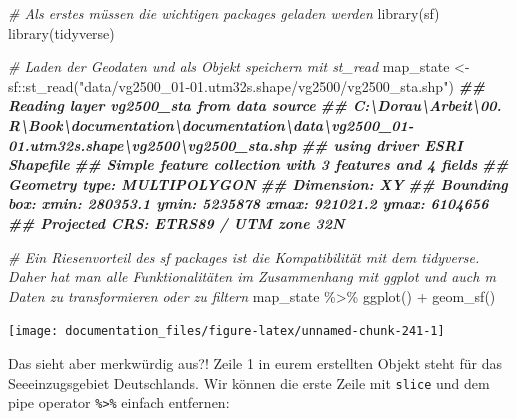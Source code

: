 \documentclass[
]{article}
\newenvironment{Shaded}{\begin{snugshade}}{\end{snugshade}}
\newcommand{\CommentTok}[1]{\textcolor[rgb]{0.56,0.35,0.01}{\textit{#1}}}
\newcommand{\DocumentationTok}[1]{\textcolor[rgb]{0.56,0.35,0.01}{\textbf{\textit{#1}}}}
\newcommand{\FunctionTok}[1]{\textcolor[rgb]{0.00,0.00,0.00}{#1}}
\newcommand{\NormalTok}[1]{#1}
\newcommand{\OtherTok}[1]{\textcolor[rgb]{0.56,0.35,0.01}{#1}}
\newcommand{\SpecialCharTok}[1]{\textcolor[rgb]{0.00,0.00,0.00}{#1}}
\newcommand{\StringTok}[1]{\textcolor[rgb]{0.31,0.60,0.02}{#1}}
\begin{document}
\begin{Shaded}
\begin{Highlighting}[]

\CommentTok{\# Als erstes müssen die wichtigen packages geladen werden}
\FunctionTok{library}\NormalTok{(sf)}
\FunctionTok{library}\NormalTok{(tidyverse)}

\CommentTok{\# Laden der Geodaten und als Objekt speichern mit \textasciigrave{}st\_read\textasciigrave{}}
\NormalTok{map\_state }\OtherTok{\textless{}{-}}\NormalTok{ sf}\SpecialCharTok{::}\FunctionTok{st\_read}\NormalTok{(}\StringTok{"data/vg2500\_01{-}01.utm32s.shape/vg2500/vg2500\_sta.shp"}\NormalTok{)}
\DocumentationTok{\#\# Reading layer \textasciigrave{}vg2500\_sta\textquotesingle{} from data source }
\DocumentationTok{\#\#   \textasciigrave{}C:\textbackslash{}Dorau\textbackslash{}Arbeit\textbackslash{}00. R\textbackslash{}Book\textbackslash{}documentation\textbackslash{}documentation\textbackslash{}data\textbackslash{}vg2500\_01{-}01.utm32s.shape\textbackslash{}vg2500\textbackslash{}vg2500\_sta.shp\textquotesingle{} }
\DocumentationTok{\#\#   using driver \textasciigrave{}ESRI Shapefile\textquotesingle{}}
\DocumentationTok{\#\# Simple feature collection with 3 features and 4 fields}
\DocumentationTok{\#\# Geometry type: MULTIPOLYGON}
\DocumentationTok{\#\# Dimension:     XY}
\DocumentationTok{\#\# Bounding box:  xmin: 280353.1 ymin: 5235878 xmax: 921021.2 ymax: 6104656}
\DocumentationTok{\#\# Projected CRS: ETRS89 / UTM zone 32N}

\CommentTok{\# Ein Riesenvorteil des sf packages ist die Kompatibilität mit dem tidyverse. Daher hat man alle Funktionalitäten im Zusammenhang mit ggplot und auch m Daten zu transformieren oder zu filtern}
\NormalTok{map\_state }\SpecialCharTok{\%\textgreater{}\%}
  \FunctionTok{ggplot}\NormalTok{() }\SpecialCharTok{+}
  \FunctionTok{geom\_sf}\NormalTok{()}
\end{Highlighting}
\end{Shaded}

\begin{center}\texttt{[image: documentation\_files/figure-latex/unnamed-chunk-241-1]} \end{center}

Das sieht aber merkwürdig aus?! Zeile 1 in eurem erstellten Objekt steht für das Seeeinzugsgebiet Deutschlands. Wir können die erste Zeile mit \texttt{slice} und dem pipe operator \texttt{\%\textgreater{}\%} einfach entfernen:
\end{document}
